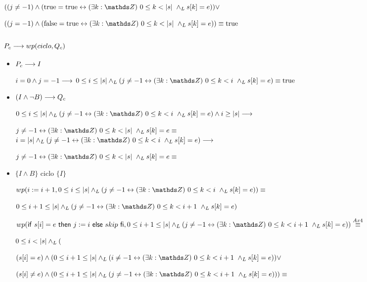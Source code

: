 \documentclass{article}
\begin{document}
$((j \neq -1) \wedge (\True = \True \Iff \existe{k}{0}{\longitud{s}} \yLuego s[k] = e)) \vee $

$((j = -1) \wedge (\False = \True \Iff \existe{k}{0}{\longitud{s}} \yLuego s[k] = e)) \equiv \True$

\subsubsection*{$P_{c} \longrightarrow wp(ciclo, Q_{c})$}

\begin{itemize}
    \item $P_{c} \longrightarrow I$

    $i = 0 \wedge j = -1 \longrightarrow$
    $0 \leq i \leq \longitud{s} \yLuego (j \neq -1 \Iff \existe{k}{0}{i} \yLuego s[k] = e) \equiv \True$

    \item $(I \wedge \neg B) \longrightarrow Q_{c}$
    
    $0 \leq i \leq \longitud{s} \yLuego (j \neq -1 \Iff \existe{k}{0}{i} \yLuego s[k] = e) \wedge i \geq \longitud{s} \implica$

    $j \neq -1 \Iff \existe{k}{0}{\longitud{s}} \yLuego s[k] = e \equiv$ \\

    $i = \longitud{s} \yLuego (j \neq -1 \Iff \existe{k}{0}{i} \yLuego s[k] = e) \implica$

    $j \neq -1 \Iff \existe{k}{0}{\longitud{s}} \yLuego s[k] = e \equiv$

    \item $\{I \wedge B\}$ ciclo $\{ I \}$
    
    $wp(i:= i+1, 0 \leq i \leq \longitud{s} \yLuego (j \neq -1 \Iff \existe{k}{0}{i} \yLuego s[k] = e))\equiv$

    $0 \leq i+1 \leq \longitud{s} \yLuego (j \neq -1 \Iff \existe{k}{0}{i+1} \yLuego s[k] = e)$

    $wp(\IfThenElse{s[i]=e}{j:=i}{skip},0 \leq i+1 \leq \longitud{s} \yLuego (j \neq -1 \Iff \existe{k}{0}{i+1} \yLuego s[k] = e)) \stackrel{Ax4}{\equiv}$

    $0 \leq i < |s| \land _L ( $
    
    $(s[i] = e) \wedge (0 \leq i+1 \leq \longitud{s} \yLuego (i \neq -1 \Iff \existe{k}{0}{i+1} \yLuego s[k] = e)) \vee$

    $(s[i] \neq e) \wedge (0 \leq i+1 \leq \longitud{s} \yLuego (j \neq -1 \Iff \existe{k}{0}{i+1} \yLuego s[k] = e))) \equiv$\\


\end{itemize}
\end{document}
